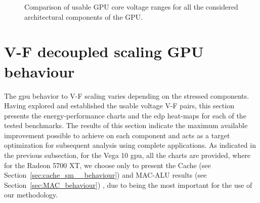 
\begin{figure}[!htb]
    \centering
    \begin{subfigmatrix}{2}
      \label{fig:Guardband_comparison}
    \end{subfigmatrix}
    \caption{Comparison of usable GPU core voltage ranges for all the considered architectural components of the GPU.}
\end{figure}

\section{V-F decoupled scaling GPU behaviour}
\label{sec:gpu_behaviour}

The \acrshort{gpu} behavior to V-F scaling varies depending on the stressed components. Having explored and established the usable voltage V-F  pairs, this section presents the energy-performance charts and the \acrshort{edp} heat-maps for each of the tested benchmarks. The results of this section indicate the maximum available improvement possible to achieve on each component and acts as a target optimization for subsequent analysis using complete applications. As indicated in the previous subsection, for the Vega 10 \acrshort{gpu}, all the charts are provided, where for the Radeon 5700 XT, we choose only to present the Cache (see Section~\ref{sec:cache_sm__behaviour}) and  MAC-ALU results (see Section~\ref{sec:MAC_behaviour}) , due to being the most important for the use of our methodology.



